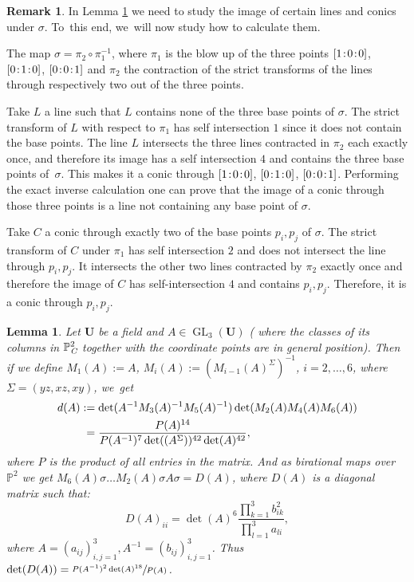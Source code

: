 \documentclass[JEP,XML,SOM,Unicode,NoFloatCountersInSection, NoEqCountersInSection,published]{cedram}
\newcommand{\sep}{\mkern2mu{:}\mkern2mu}
\newtheorem{lemma}[theorem]{Lemma}
\theoremstyle{definition}
\newtheorem{remark}[theorem]{Remark}
\DeclareMathOperator{\GL}{GL}
\begin{document}
\begin{remark} \label{rem: image under sigma}
In Lemma \ref{LargeCalc} we need to study the image of certain lines and conics under $\sigma$. To~this end, we~will now study how to calculate them.

The map $\sigma = \pi_2 \circ \pi_1^{-1}$, where $\pi_1$ is the blow up of the three points $[1\sep 0\sep 0]$, $[0\sep 1\sep 0]$, $[0\sep 0\sep 1]$ and $\pi_2$ the contraction of the strict transforms of the lines through respectively two out of the three points.

Take $L$ a line such that $L$ contains none of the three base points of $\sigma$. The strict transform of $L$ with respect to $\pi_1$ has self intersection $1$ since it does not contain the base points. The line $L$ intersects the three lines contracted in $\pi_2$ each exactly once, and therefore its image has a self intersection $4$ and contains the three base points of~$\sigma$. This makes it a conic through $[1\sep 0\sep 0]$, $[0\sep 1\sep 0]$, $[0\sep 0\sep 1]$. Performing the exact inverse calculation one can prove that the image of a conic through those three points is a line not containing any base point of $\sigma$.

Take $C$ a conic through exactly two of the base points $p_i,p_j$ of $\sigma$. The strict transform of $C$ under $\pi_1$ has self intersection $2$ and does not intersect the line through $p_i,p_j$. It intersects the other two lines contracted by $\pi_2$ exactly once and therefore the image of $C$ has self-intersection $4$ and contains $p_i,p_j$. Therefore, it is a conic through $p_i,p_j$.
\end{remark}

\begin{lemma} \label{LargeCalc}
Let $\mathbf{U}$ be a field and $A \in \GL_3(\mathbf{U})$ ( where the classes of its columns in $\mathbb{P}^2_{\emph{C}}$ together with the coordinate points are in general position). Then if we define $M_1(A):= A$, $M_i(A) := (M_{i-1}(A)^{\Sigma})^{-1}$, $i=2, \dots , 6$, where $\Sigma = (yz,xz,xy)$, we~get
\begin{align*}
d(A)&:= \det(A^{-1}M_3(A)^{-1}M_5(A)^{-1})\det(M_2(A)M_4(A)M_6(A))
\\
&\hphantom{:}= \frac{P(A)^{14}}{P(A^{-1})^7 \det((A^{\Sigma}))^{42}\det(A)^{42}},
\end{align*}
where $P$ is the product of all entries in the matrix. And as birational maps over $\mathbb{P}^2$ we get $M_6(A) \sigma \dots M_2(A) \sigma A \sigma = D(A)$, where $D(A)$ is a diagonal matrix such that:
\[
D(A)_{ii} = \det(A)^6\frac{\prod_{k=1}^3 b_{ik}^2}{\prod_{l=1}^3a_{li}},
\]
where $A = (a_{ij})_{i,j = 1}^3, A^{-1} = (b_{ij})_{i,j = 1}^3$. Thus $\det(D(A)) =\sfrac{P(A^{-1})^2\det(A)^{18}}{P(A)}$.
\end{lemma}
\end{document}
